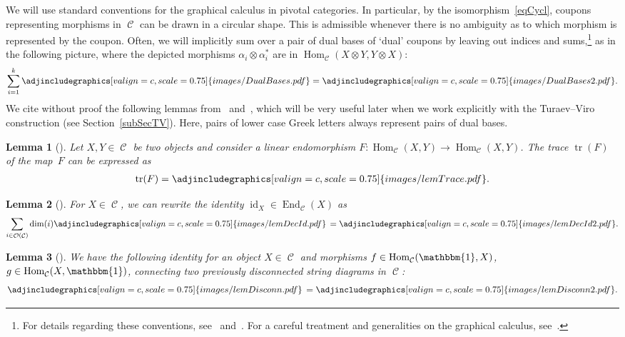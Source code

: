 \documentclass[pdftex]{sigma}
\DeclareMathOperator{\id}{id}
\DeclareMathOperator{\End}{End}
\DeclareMathOperator{\Hom}{Hom}
\DeclareMathOperator{\tr}{tr}
\DeclareMathOperator{\calc}{\mathcal{C}}
\DeclareMathOperator{\calo}{\mathcal{O}}
\numberwithin{equation}{section}
\newtheorem{Lemma}[Lemma]{Lemma}
\theoremstyle{definition}
\begin{document}
We will use standard conventions for the graphical calculus in pivotal categories. In particular, by the  isomorphism~\eqref{eqCycl}, coupons representing morphisms in $\calc$ can be drawn in a circular shape. This is admissible whenever there is no ambiguity as to which morphism is represented by the coupon. Often, we will implicitly sum over a pair of dual bases of `dual' coupons by leaving out indices and sums,\footnote{For details regarding these conventions, see~\cite{FS} and~\cite{BK}. For a careful treatment and generalities on the graphical calculus, see~\cite{TV}.} as in the following picture, where the depicted morphisms $\alpha_i \otimes \alpha_i^*$ are in $\Hom_{\calc}({X \otimes Y}, Y \otimes X)$:
\begin{align*}
 \sum_{i = 1}^k \adjincludegraphics[valign=c, scale = 0.75]{images/DualBases.pdf} = \adjincludegraphics[valign=c, scale = 0.75]{images/DualBases2.pdf}.
\end{align*}
We cite without proof the following lemmas from~\cite{BK} and~\cite{FS}, which will be very useful later when we work explicitly with the Turaev--Viro construction (see Section~\ref{subSecTV}). Here, pairs of lower case Greek letters always represent pairs of dual bases.
\begin{Lemma}[{\cite[Lemma~4]{FS}}]
 \label{lemTrace}
 Let $X, Y \in \calc$ be two objects and consider a linear endomorphism $F\colon \Hom_{\calc}(X, Y) \rightarrow \Hom_{\calc}(X, Y)$. The trace $\tr(F)$ of the map~$F$ can be expressed as
 \begin{align*}
 \tr(F)   =   \adjincludegraphics[valign=c, scale = 0.75]{images/lemTrace.pdf}.
 \end{align*}
\end{Lemma}

\begin{Lemma}[{\cite[Lemma 1.1]{BK}}]\label{lemDecId}
For $X \in \calc$, we can rewrite the identity $\id_X \in \End_{\calc}(X)$ as
 \begin{align*}
 \sum_{i \in \calo(\calc)} \dim(i) \adjincludegraphics[valign=c, scale = 0.75]{images/lemDecId.pdf} \,  =   \adjincludegraphics[valign=c, scale = 0.75]{images/lemDecId2.pdf}.
 \end{align*}
\end{Lemma}

\begin{Lemma}[{\cite[Lemma 1.3]{BK}}]\label{lemDisconn}
We have the following identity for an object $X \in \calc$ and morphisms $f \in \Hom_{\calc}(\mathbbm{1}, X)$, $g \in \Hom_{\calc}(X, \mathbbm{1})$, connecting two previously disconnected string diagrams in $\calc$:
\begin{align*}
 \adjincludegraphics[valign=c, scale = 0.75]{images/lemDisconn.pdf} \,  =   \adjincludegraphics[valign=c, scale = 0.75]{images/lemDisconn2.pdf}.
\end{align*}
\end{Lemma}
\end{document}
